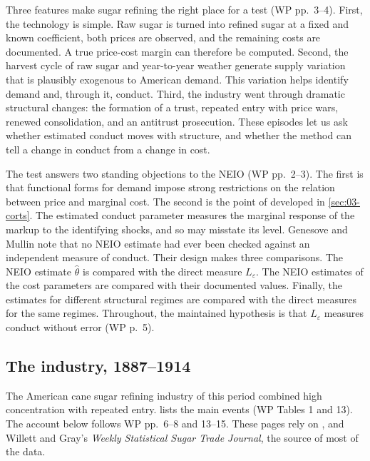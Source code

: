 Three features make sugar refining the right place for a test (WP pp.~3--4). First, the technology is
simple. Raw sugar is turned into refined sugar at a fixed and known coefficient, both prices are observed,
and the remaining costs are documented. A true price-cost margin can therefore be computed. Second, the
harvest cycle of raw sugar and year-to-year weather generate supply variation that is plausibly exogenous to
American demand. This variation helps identify demand and, through it, conduct. Third, the industry went
through dramatic structural changes: the formation of a trust, repeated entry with price wars, renewed
consolidation, and an antitrust prosecution. These episodes let us ask whether estimated conduct moves with
structure, and whether the method can tell a change in conduct from a change in cost.

The test answers two standing objections to the NEIO (WP pp.~2--3). The first is that functional forms for
demand impose strong restrictions on the relation between price and marginal cost. The second is the point
of \citet{Corts1999} developed in \cref{sec:03-corts}. The estimated conduct parameter measures the marginal
response of the markup to the identifying shocks, and so may misstate its level. Genesove and Mullin note
that no NEIO estimate had ever been checked against an independent measure of conduct. Their design makes
three comparisons. The NEIO estimate $\hat\theta$ is compared with the direct measure $L_\varepsilon$. The
NEIO estimates of the cost parameters are compared with their documented values. Finally, the estimates for
different structural regimes are compared with the direct measures for the same regimes. Throughout, the
maintained hypothesis is that $L_\varepsilon$ measures conduct without error (WP p.~5).

\subsection{The industry, 1887--1914}\label{sec:03-sugar-history}

The American cane sugar refining industry of this period combined high concentration with repeated entry.
 lists the main events (WP Tables 1 and 13). The account below follows WP
pp.~6--8 and 13--15. These pages rely on \citet{Eichner1969}, \citet{Zerbe1969} and Willett and Gray's
\emph{Weekly Statistical Sugar Trade Journal}, the source of most of the data.

